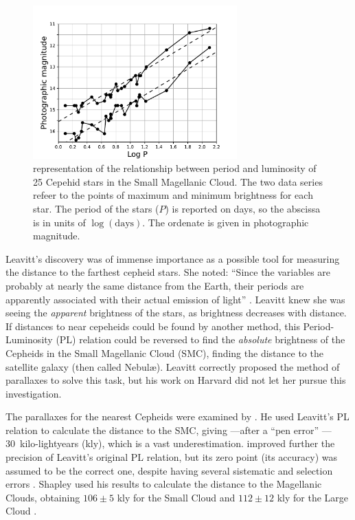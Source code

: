 \begin{figure}[H] 
	\centering
	\includegraphics[width=0.7\textwidth]{img/leavitt.pdf}
	\caption{\cite{Leavitt1912} representation of the relationship between period and luminosity 
	of 25 Cepehid stars in the Small Magellanic Cloud.
	The two data series refeer to the points of maximum and minimum brightness for each star. 
	The period of the stars ($P$) is reported on days, so the abscissa is in units of $\log(\text{days})$.
	The ordenate is given in photographic magnitude.
	}
	\label{fig:leavitt}
\end{figure}


Leavitt's discovery was of immense importance as a possible tool for measuring the distance to the farthest cepheid stars. 
She noted: \enquote{Since the variables are probably at nearly the same distance from the Earth,
their periods are apparently associated with their actual emission of light} \citep[page 3]{Leavitt1912}.
Leavitt knew she was seeing the \textit{apparent} brightness of the stars, as brightness decreases with distance.
If distances to near cepeheids could be found by another method, 
this Period-Luminosity (PL) relation could be reversed to find the \textit{absolute} brightness of the Cepheids in the Small Magellanic Cloud (SMC),
finding the distance to the satellite galaxy (then called Nebul\ae{}).
Leavitt correctly proposed the method of parallaxes to solve this task, but his work on Harvard did not let her pursue this investigation.


The parallaxes for the nearest Cepheids were examined by \citep{Hertzsprung1913}.
He used Leavitt's PL relation to calculate the distance to the SMC, 
giving ---after a \enquote{pen error} \citep{Fernie1969}--- 30~kilo-lightyears (kly), which is a vast underestimation.
\cite{Shapley1918} improved further the precision of Leavitt's original PL relation, 
but its zero point (its accuracy) was assumed to be the correct one, despite having several sistematic and selection errors \citep{Fernie1969}.
Shapley used his results to calculate the distance to the Magellanic Clouds, 
obtaining $106\pm5$ kly for the Small Cloud \citep{Shapley1924S} and $112\pm12$ kly for the Large Cloud \citep{Shapley1924L}.

